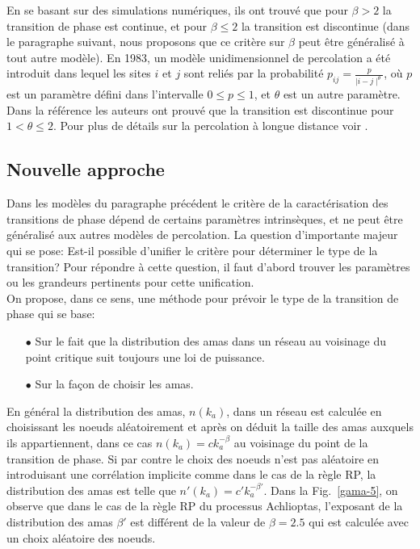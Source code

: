 En se basant sur des simulations numériques, ils ont trouvé que pour $\beta>2$ la transition de phase est continue, et pour $\beta \le 2$ la transition est discontinue (dans le paragraphe suivant, nous proposons que ce critère sur $\beta$ peut être généralisé à tout autre modèle). En 1983, un modèle unidimensionnel de percolation a été introduit \cite{Schulman1983} dans lequel les sites $i$ et $j$ sont reliés par la probabilité $p_{ij}=\frac{p}{\mid i-j\mid^\theta}$, où $p$ est un paramètre défini dans l'intervalle $0\leq p\leq1$, et $\theta$ est un autre  paramètre. Dans la référence \cite{Aizenman-Newman1986} les auteurs ont prouvé que la transition est discontinue pour $1<\theta\leq2$. Pour plus de détails sur la percolation à longue distance voir \cite{Lee-al2016}.\\
\label{etat-art}
\subsection{Nouvelle approche}
Dans les modèles du paragraphe précédent le critère de la caractérisation des transitions de phase dépend de certains paramètres intrinsèques,  et ne peut être généralisé aux autres modèles de percolation. La question d'importante majeur qui se pose: Est-il possible d'unifier le critère pour déterminer le type de la transition? Pour répondre à cette question, il faut d'abord trouver les paramètres ou les grandeurs pertinents pour cette unification.\\
On propose, dans ce sens, une méthode pour prévoir le type de la transition de phase qui se base:
\begin{itemize}
\item[$\bullet$] Sur le fait que la distribution des amas dans un réseau au voisinage du point critique suit toujours une loi de puissance.
\item[$\bullet$] Sur la façon de choisir les amas.
\end{itemize}
En général la distribution des amas, $n(k_a)$, dans un réseau est calculée en choisissant les noeuds aléatoirement et après on déduit la taille des amas auxquels ils appartiennent, dans ce cas $n(k_a)=ck_a^{-\beta}$ au voisinage du point de la transition de phase. Si par contre le choix des noeuds n'est pas aléatoire en introduisant une corrélation implicite comme dans le cas de la règle RP, la distribution des amas est telle que $n'(k_a)=c'k_a^{-\beta'}$.  Dans la Fig.~\ref{gama-5}, on observe que dans le cas de la règle RP du processus Achlioptas, l'exposant de la distribution des amas $\beta'$ est différent de la valeur de $\beta=2.5$ qui est calculée avec un choix aléatoire des noeuds.\\

